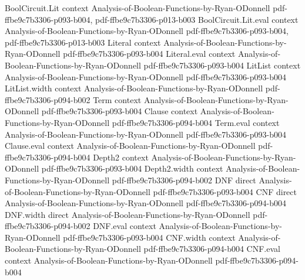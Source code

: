\begin{lemma}
\leanok
{}
\proofstep
  {BoolCircuit.Lit}
  {context}
  {Analysis-of-Boolean-Functions-by-Ryan-ODonnell}
  {pdf-ffbe9c7b3306-p093-b004,
    pdf-ffbe9c7b3306-p013-b003}
\proofstep
  {BoolCircuit.Lit.eval}
  {context}
  {Analysis-of-Boolean-Functions-by-Ryan-ODonnell}
  {pdf-ffbe9c7b3306-p093-b004,
    pdf-ffbe9c7b3306-p013-b003}
\proofstep
  {Literal}
  {context}
  {Analysis-of-Boolean-Functions-by-Ryan-ODonnell}
  {pdf-ffbe9c7b3306-p093-b004}
\proofstep
  {Literal.eval}
  {context}
  {Analysis-of-Boolean-Functions-by-Ryan-ODonnell}
  {pdf-ffbe9c7b3306-p093-b004}
\proofstep
  {LitList}
  {context}
  {Analysis-of-Boolean-Functions-by-Ryan-ODonnell}
  {pdf-ffbe9c7b3306-p093-b004}
\proofstep
  {LitList.width}
  {context}
  {Analysis-of-Boolean-Functions-by-Ryan-ODonnell}
  {pdf-ffbe9c7b3306-p094-b002}
\proofstep
  {Term}
  {context}
  {Analysis-of-Boolean-Functions-by-Ryan-ODonnell}
  {pdf-ffbe9c7b3306-p093-b004}
\proofstep
  {Clause}
  {context}
  {Analysis-of-Boolean-Functions-by-Ryan-ODonnell}
  {pdf-ffbe9c7b3306-p094-b004}
\proofstep
  {Term.eval}
  {context}
  {Analysis-of-Boolean-Functions-by-Ryan-ODonnell}
  {pdf-ffbe9c7b3306-p093-b004}
\proofstep
  {Clause.eval}
  {context}
  {Analysis-of-Boolean-Functions-by-Ryan-ODonnell}
  {pdf-ffbe9c7b3306-p094-b004}
\proofstep
  {Depth2}
  {context}
  {Analysis-of-Boolean-Functions-by-Ryan-ODonnell}
  {pdf-ffbe9c7b3306-p093-b004}
\proofstep
  {Depth2.width}
  {context}
  {Analysis-of-Boolean-Functions-by-Ryan-ODonnell}
  {pdf-ffbe9c7b3306-p094-b002}
\proofstep
  {DNF}
  {direct}
  {Analysis-of-Boolean-Functions-by-Ryan-ODonnell}
  {pdf-ffbe9c7b3306-p093-b004}
\proofstep
  {CNF}
  {direct}
  {Analysis-of-Boolean-Functions-by-Ryan-ODonnell}
  {pdf-ffbe9c7b3306-p094-b004}
\proofstep
  {DNF.width}
  {direct}
  {Analysis-of-Boolean-Functions-by-Ryan-ODonnell}
  {pdf-ffbe9c7b3306-p094-b002}
\proofstep
  {DNF.eval}
  {context}
  {Analysis-of-Boolean-Functions-by-Ryan-ODonnell}
  {pdf-ffbe9c7b3306-p093-b004}
\proofstep
  {CNF.width}
  {context}
  {Analysis-of-Boolean-Functions-by-Ryan-ODonnell}
  {pdf-ffbe9c7b3306-p094-b004}
\proofstep
  {CNF.eval}
  {context}
  {Analysis-of-Boolean-Functions-by-Ryan-ODonnell}
  {pdf-ffbe9c7b3306-p094-b004}

\end{lemma}
